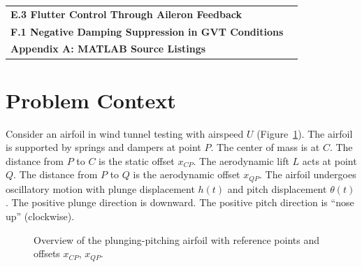 \documentclass[12pt]{article}
\begin{document}
\begin{center}
\begin{tcolorbox}[colback=white, colframe=gray!50!black, colbacktitle=gray!20!white,
                  coltitle=black, sharp corners, boxrule=1pt,
                  title=\Large\bfseries Table of Contents]
\begin{tabular}{p{}r}
\textbf{E.3 Flutter Control Through Aileron Feedback} \dotfill & \textbf{\pageref{quest:E3}} \\
\textbf{F.1 Negative Damping Suppression in GVT Conditions} \dotfill & \textbf{\pageref{quest:F1}} \\
\textbf{Appendix A: MATLAB Source Listings} \dotfill & \textbf{\pageref{appendix:matlab}} \\
\end{tabular}
\vspace{0.2cm}
\end{tcolorbox}
\end{center}

\clearpage

\section*{Problem Context}

Consider an airfoil in wind tunnel testing with airspeed $U$ (Figure~\ref{fig:airfoil-overview}). The airfoil is supported by springs and dampers at point $P$. The center of mass is at $C$. The distance from $P$ to $C$ is the static offset $x_{CP}$. The aerodynamic lift $L$ acts at point $Q$. The distance from $P$ to $Q$ is the aerodynamic offset $x_{QP}$. The airfoil undergoes oscillatory motion with plunge displacement $h(t)$ and pitch displacement $\theta(t)$. The positive plunge direction is downward. The positive pitch direction is ``nose up'' (clockwise).

\begin{figure}[htbp]
  \centering
  
  \caption{Overview of the plunging-pitching airfoil with reference points and offsets $x_{CP}$, $x_{QP}$.}
  \label{fig:airfoil-overview}
\end{figure}
\end{document}
